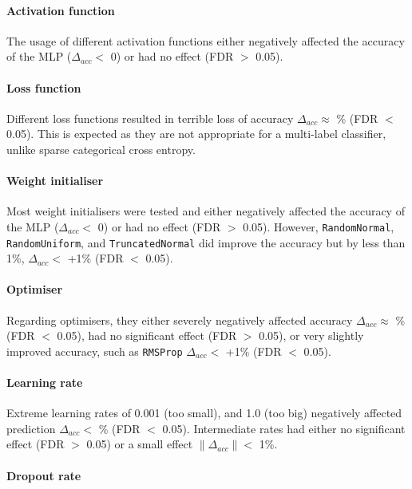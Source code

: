 \paragraph{Activation function}

The usage of different activation functions either negatively affected the accuracy of the MLP ($\Delta_{acc} <$ 0) or had no effect (FDR $>$ 0.05).

\paragraph{Loss function}

Different loss functions resulted in terrible loss of accuracy $\Delta_{acc} \approx$ \% (FDR $<$ 0.05). This is expected as they are not appropriate for a multi-label classifier, unlike sparse categorical cross entropy.

\paragraph{Weight initialiser}

Most weight initialisers were tested and either negatively affected the accuracy of the MLP ($\Delta_{acc} <$ 0) or had no effect (FDR $>$ 0.05). However, \texttt{RandomNormal}, \texttt{RandomUniform}, and \texttt{TruncatedNormal} did improve the accuracy but by less than 1\%, $\Delta_{acc} <$ +1\% (FDR $<$ 0.05).

\paragraph{Optimiser}

Regarding optimisers, they either severely negatively affected accuracy $\Delta_{acc} \approx$ \% (FDR $<$ 0.05), had no significant effect (FDR $>$ 0.05), or very slightly improved accuracy, such as \texttt{RMSProp} $\Delta_{acc} <$ +1\% (FDR $<$ 0.05).

\paragraph{Learning rate}

Extreme learning rates of 0.001 (too small), and 1.0 (too big) negatively affected prediction $\Delta_{acc} <$ \% (FDR $<$ 0.05). Intermediate rates had either no significant effect (FDR $>$ 0.05) or a small effect $\|\Delta_{acc}\| <$ 1\%.

\paragraph{Dropout rate}

